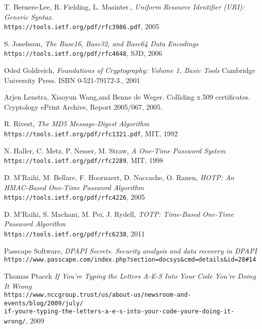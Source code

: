 \begin{thebibliography}{9}

T. Berners-Lee, R. Fielding, L. Masinter.,
\textit{Uniform Resource Identifier (URI): Generic Syntax.} \\ 
\texttt{https://tools.ietf.org/pdf/rfc3986.pdf}, 2005

S. Josefsson,
\textit{The Base16, Base32, and Base64 Data Encodings} \\ 
\texttt{https://tools.ietf.org/pdf/rfc4648}, SJD, 2006

Oded Goldreich,
\textit{Foundations of Cryptography: Volume 1, Basic Tools}  
Cambridge University Press. ISBN 0-521-79172-3., 2001

Arjen Lenstra, Xiaoyun Wang,and Benne de Weger. Colliding
x.509 certificates. Cryptology ePrint Archive, Report 2005/067,
2005.

R. Rivest,
\textit{The MD5 Message-Digest Algorithm} \\ 
\texttt{https://tools.ietf.org/pdf/rfc1321.pdf}, MIT, 1992

N. Haller, C. Metz, P. Nesser, M. Straw, 
\textit{A One-Time Password System} \\ 
\texttt{https://tools.ietf.org/pdf/rfc2289}, MIT, 1998

D. M'Raihi, M. Bellare, F. Hoornaert, D. Naccache, O. Ranen, 
\textit{HOTP: An HMAC-Based One-Time Password Algorithm} \\ 
\texttt{https://tools.ietf.org/pdf/rfc4226}, 2005

D. M'Raihi, S. Machani, M. Pei, J. Rydell,
\textit{TOTP: Time-Based One-Time Password Algorithm} \\ 
\texttt{https://tools.ietf.org/pdf/rfc6238}, 2011

Passcape Software,
\textit{DPAPI Secrets. Security analysis and data recovery in DPAPI} \\ 
\texttt{https://www.passcape.com/index.php?section=docsys\&cmd=details\&id=28\#14}

Thomas Ptacek
\textit{If You’re Typing the Letters A-E-S Into Your Code You’re Doing It Wrong} \\ 
\texttt{https://www.nccgroup.trust/us/about-us/newsroom-and-events/blog/2009/july/ \\if-youre-typing-the-letters-a-e-s-into-your-code-youre-doing-it-wrong/}, 2009


\end{thebibliography}
